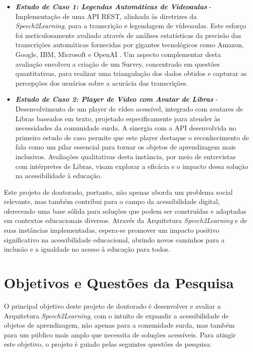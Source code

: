 \begin{itemize}
    \item \textbf{\textit{Estudo de Caso 1: Legendas Automáticas de Videoaulas}} - Implementação de uma API REST, alinhada às diretrizes da \textit{Speech2Learning}, para a transcrição e legendagem de vídeoaulas. Este esforço foi meticulosamente avaliado através de análises estatísticas da precisão das transcrições automáticas fornecidas por gigantes tecnológicos como Amazon, Google, IBM, Microsoft e OpenAI \cite{FalvoJr2023_HICSS}. Um aspecto complementar desta avaliação envolveu a criação de um Survey, concentrado em questões quantitativas, para realizar uma triangulação dos dados obtidos e capturar as percepções dos usuários sobre a acurácia das transcrições.
    \item \textbf{\textit{Estudo de Caso 2: Player de Vídeo com Avatar de Libras}} - Desenvolvimento de um player de vídeo acessível, integrado com avatares de Libras baseados em texto, projetado especificamente para atender às necessidades da comunidade surda. A sinergia com a API desenvolvida no primeiro estudo de caso permite que este player destaque o reconhecimento de fala como um pilar essencial para tornar os objetos de aprendizagem mais inclusivos. Avaliações qualitativas desta instância, por meio de entrevistas com intérpretes de Libras, visam explorar a eficácia e o impacto dessa solução na acessibilidade à educação.
\end{itemize}

Este projeto de doutorado, portanto, não apenas aborda um problema social relevante, mas também contribui para o campo da acessibilidade digital, oferecendo uma base sólida para soluções que podem ser construídas e adaptadas em contextos educacionais diversos. Através da Arquitetura \textit{Speech2Learning} e de suas instâncias implementadas, espera-se promover um impacto positivo significativo na acessibilidade educacional, abrindo novos caminhos para a inclusão e a igualdade no acesso à educação para todos.

\section{Objetivos e Questões da Pesquisa}

O principal objetivo deste projeto de doutorado é desenvolver e avaliar a Arquitetura \textit{Speech2Learning}, com o intuito de expandir a acessibilidade de objetos de aprendizagem, não apenas para a comunidade surda, mas também para um público mais amplo que necessita de soluções acessíveis. Para atingir este objetivo, o projeto é guiado pelas seguintes questões de pesquisa:


